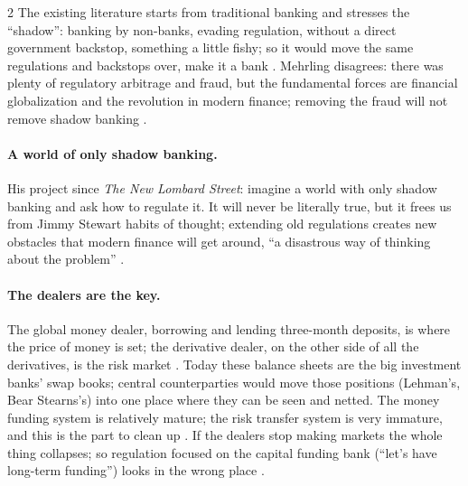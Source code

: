 \begin{paracol}{2}
The existing literature starts from traditional banking and stresses the ``shadow'': banking by non-banks, evading regulation, without a direct government backstop,
something a little fishy; so it would move the same regulations and backstops over, make it a bank .
Mehrling disagrees: there was plenty of regulatory arbitrage and fraud, but the fundamental forces are financial globalization and the revolution in modern finance;
removing the fraud will not remove shadow banking .

\paragraph{A world of only shadow banking.} His project since \emph{The New Lombard Street}: imagine a world with only shadow banking and ask how to regulate it. It
will never be literally true, but it frees us from Jimmy Stewart habits of thought; extending old regulations creates new obstacles that modern finance will get
around, ``a disastrous way of thinking about the problem'' .

\begin{nfigure}
\begin{taccts}
\quad
{}\quad
{}
\end{taccts}
\begin{taccts}
\end{taccts}
\caption{Mehrling's idealized market-based credit system: the dealers stand between the asset manager and the capital funding bank in the funding market and in the
risk market .}\label{fig:cbs-ideal}
\end{nfigure}

\paragraph{The dealers are the key.} The global money dealer, borrowing and lending three-month deposits, is where the price of money is set; the derivative dealer, on the
other side of all the derivatives, is the risk market . Today these balance sheets are the big investment banks' swap
books; central counterparties would move those positions (Lehman's, Bear Stearns's) into one place where they can be seen and netted. The money funding system is
relatively mature; the risk transfer system is very immature, and this is the part to clean up . If the
dealers stop making markets the whole thing collapses; so regulation focused on the capital funding bank (``let's have long-term funding'') looks in the wrong place
.


\end{paracol}
